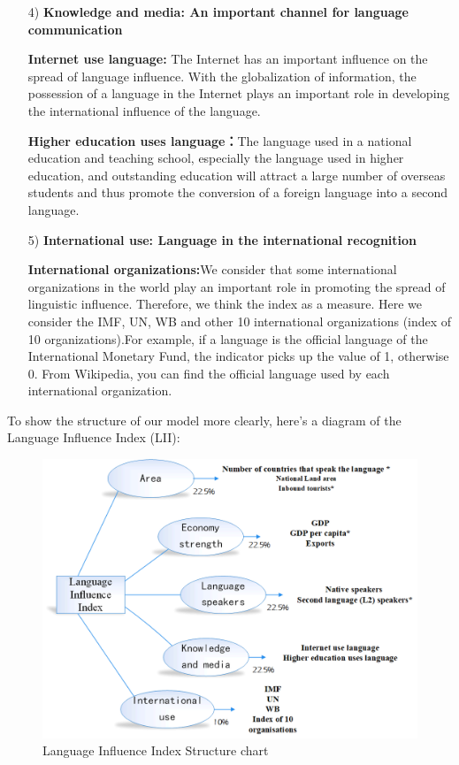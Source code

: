 \begin{enumerate}
	\item[4)] \textbf{Knowledge and media: An important channel for language communication}
	\par\textbf{Internet use language: } The Internet has an important influence on the spread of language influence. With the globalization of information, the possession of a language in the Internet plays an important role in developing the international influence of the language.
	\par \textbf{Higher education uses language：}The language used in a national education and teaching school, especially the language used in higher education, and outstanding education will attract a large number of overseas students and thus promote the conversion of a foreign language into a second language.
	
	\item[5)] \textbf{International use: Language in the international recognition}
	\par \textbf{International organizations:}We consider that some international organizations in the world play an important role in promoting the spread of linguistic influence. Therefore, we think the index as a measure. Here we consider the IMF, UN, WB and other 10 international organizations (index of 10 organizations).For example, if a language is the official language of the International Monetary Fund, the indicator picks up the value of 1, otherwise 0. From Wikipedia, you can find the official language used by each international organization.
	
\end{enumerate}

\par To show the structure of our model more clearly, here's a diagram of the Language Influence Index (LII):

\begin{figure}[H]
	\centering
	\includegraphics[width=1\linewidth]{figures/chart}
	\caption{Language Influence Index Structure chart}
	\label{fig:chart}
\end{figure}

